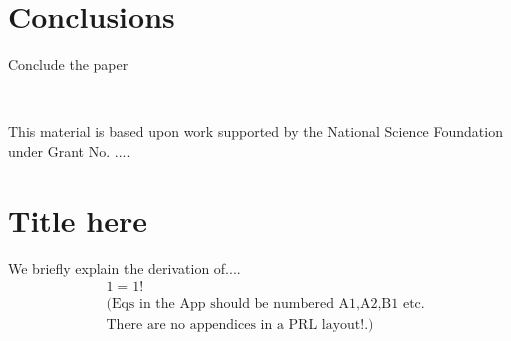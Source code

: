 \documentclass[pre,aps,reprint,noshowpacs,superscriptaddress,floatfix,letterpaper,longbibliography]{revtex4-2}
\begin{document}
\lipsum[2-2]

\section{Conclusions}

Conclude the paper

\lipsum[2-3]
\\ 

\begin{acknowledgments}
This material is based upon work supported by the National Science Foundation under Grant No. ....

\end{acknowledgments}

 

\appendix

\section{Title here}
\label{AppAT} 
We briefly explain the derivation of.... 
\begin{align}
    &1=1!\nonumber\\ 
    &(\text{Eqs in the App should be numbered A1,A2,B1 etc.}\nonumber\\ 
    &\text{There are no appendices in a PRL layout!.)}
\end{align}


\end{document}
